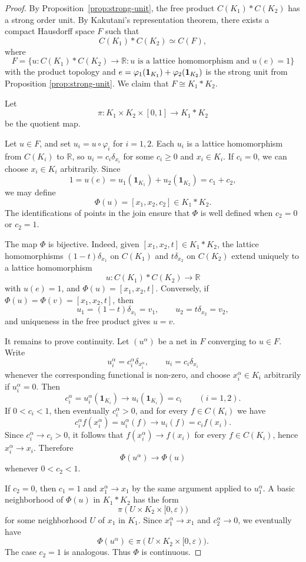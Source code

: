 \documentclass[12pt]{amsart}
\newcommand{\one}{\mathbf{1}}
\theoremstyle{plain}
\theoremstyle{definition}
\begin{document}
\begin{proof}
By Proposition~\ref{prop:strong-unit}, the free product $C(K_1)\ast C(K_2)$ has a strong order unit. By Kakutani's representation theorem, there exists a compact Hausdorff space $F$ such that
\[
C(K_1)\ast C(K_2)\simeq C(F),
\]
where \[
F=\{u:C(K_1)*C(K_2)\to\mathbb R:u\text{ is a lattice homomorphism and } u(e)=1\}
\]
with the product topology and $e=\varphi_1(\bold 1_{K_1})+\varphi_2(\bold 1_{K_2})$ is the strong unit from Proposition \ref{prop:strong-unit}. We claim that $F\cong K_1*K_2$.

Let
\[
\pi:K_1\times K_2\times [0,1]\to K_1\ast K_2
\]
be the quotient map. 

Let $u\in F$, and set $u_i=u\circ \varphi_i$ for $i=1,2$. Each $u_i$ is a lattice homomorphism from $C(K_i)$ to $\mathbb{R}$, so $u_i=c_i\delta_{x_i}$ for some $c_i\geq 0$ and $x_i\in K_i$. If $c_i=0$, we can choose $x_i\in K_i$ arbitrarily. Since
\[
1=u(e)=u_1(\one_{K_1})+u_2(\one_{K_2})=c_1+c_2,
\]
we may define
\[
\Phi(u)=[x_1,x_2,c_2]\in K_1\ast K_2.
\]
The identifications of points in the join ensure that $\Phi$ is well defined when $c_2=0$ or $c_2=1$.

The map $\Phi$ is bijective. Indeed, given $[x_1,x_2,t]\in K_1\ast K_2$, the lattice homomorphisms $(1-t)\delta_{x_1}$ on $C(K_1)$ and $t\delta_{x_2}$ on $C(K_2)$ extend uniquely to a lattice homomorphism
\[
u:C(K_1)\ast C(K_2)\to \mathbb{R}
\]
with $u(e)=1$, and $\Phi(u)=[x_1,x_2,t]$. Conversely, if $\Phi(u)=\Phi(v)=[x_1,x_2,t]$, then
\[
u_1=(1-t)\delta_{x_1}=v_1,
\qquad
u_2=t\delta_{x_2}=v_2,
\]
and uniqueness in the free product gives $u=v$.

It remains to prove continuity. Let $(u^\alpha)$ be a net in $F$ converging to $u\in F$. Write
\[
u_i^\alpha=c_i^\alpha\delta_{x_i^\alpha},
\qquad
u_i=c_i\delta_{x_i}
\]
whenever the corresponding functional is non-zero, and choose $x_i^\alpha\in K_i$ arbitrarily if $u_i^\alpha=0$. Then
\[
c_i^\alpha=u_i^\alpha(\one_{K_i})\longrightarrow u_i(\one_{K_i})=c_i
\qquad (i=1,2).
\]
If $0<c_i<1$, then eventually $c_i^\alpha>0$, and for every $f\in C(K_i)$ we have
\[
c_i^\alpha f(x_i^\alpha)=u_i^\alpha(f)\longrightarrow u_i(f)=c_i f(x_i).
\]
Since $c_i^\alpha\to c_i>0$, it follows that $f(x_i^\alpha)\to f(x_i)$ for every $f\in C(K_i)$, hence $x_i^\alpha\to x_i$. Therefore
\[
\Phi(u^\alpha)\to \Phi(u)
\]
whenever $0<c_2<1$.

If $c_2=0$, then $c_1=1$ and $x_1^\alpha\to x_1$ by the same argument applied to $u_1^\alpha$. A basic neighborhood of $\Phi(u)$ in $K_1\ast K_2$ has the form
\[
\pi(U\times K_2\times [0,\varepsilon))
\]
for some neighborhood $U$ of $x_1$ in $K_1$. Since $x_1^\alpha\to x_1$ and $c_2^\alpha\to 0$, we eventually have
\[
\Phi(u^\alpha)\in \pi(U\times K_2\times [0,\varepsilon)).
\]
The case $c_2=1$ is analogous. Thus $\Phi$ is continuous.


\end{proof}
\end{document}
